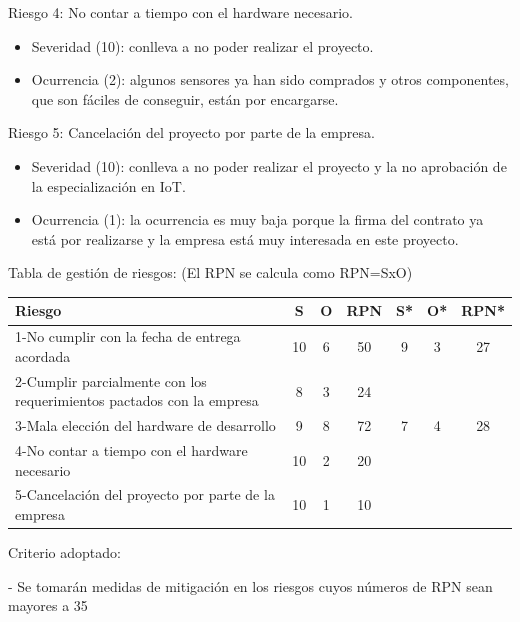 \documentclass[
11pt, %
]{charter}
\begin{document}
Riesgo 4: No contar a tiempo con el hardware necesario.
\begin{itemize}
	\item Severidad (10): conlleva a no poder realizar el proyecto.
	\item Ocurrencia (2): algunos sensores ya han sido comprados y otros componentes, que son fáciles de conseguir, están por encargarse.
\end{itemize}

Riesgo 5: Cancelación del proyecto por parte de la empresa.
\begin{itemize}
	\item Severidad (10): conlleva a no poder realizar el proyecto y la no aprobación de la especialización en IoT.
	\item Ocurrencia (1): la ocurrencia es muy baja porque la firma del contrato ya está por realizarse y la empresa está muy interesada en este proyecto.
\end{itemize}


Tabla de gestión de riesgos: (El RPN se calcula como RPN=SxO)

\begin{table}[htpb]
\centering
\begin{tabularx}{\linewidth}{@{}|X|c|c|c|c|c|c|@{}}
\hline
\rowcolor[HTML]{C0C0C0} 
Riesgo & S & O & RPN & S* & O* & RPN* \\ \hline
1-No cumplir con la fecha de entrega acordada       &10   &6   &50 \cellcolor{blue!15}     &9\cellcolor{black!10}    &3\cellcolor{black!10}    &27\cellcolor{blue!35}      \\ \hline
2-Cumplir parcialmente con los requerimientos pactados con la empresa      &8   &3   &24     &    &    &      \\ \hline
3-Mala elección del hardware de desarrollo       &9  &8   &72 \cellcolor{blue!15}     &7\cellcolor{black!10}    &4\cellcolor{black!10}    &28\cellcolor{blue!35}      \\ \hline
4-No contar a tiempo con el hardware necesario       &10   &2   &20     &    &    &      \\ \hline
5-Cancelación del proyecto por parte de la empresa       &10   &1   &10    &    &    &      \\ \hline
\end{tabularx}%
\end{table}

Criterio adoptado:

- Se tomarán medidas de mitigación en los riesgos cuyos números de RPN sean mayores a 35
\end{document}

